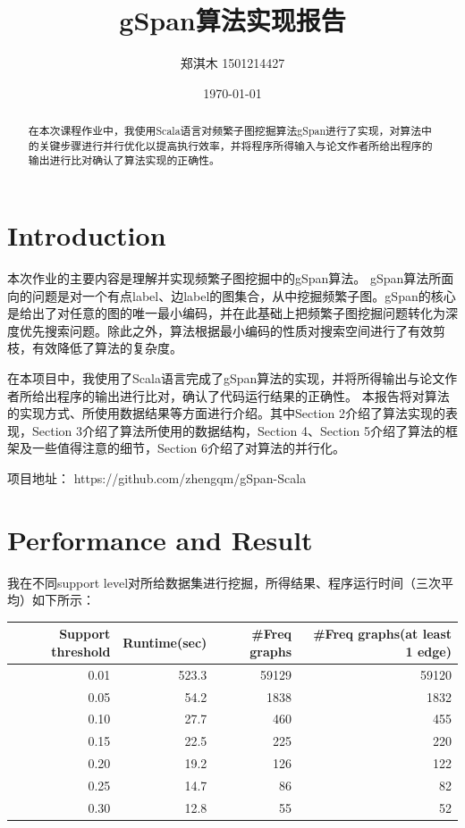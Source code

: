 \documentclass{article}
\title{gSpan算法实现报告}
\author{郑淇木  1501214427}
\date{\today}
\begin{document}
\maketitle

\begin{abstract}
在本次课程作业中，我使用Scala语言对频繁子图挖掘算法gSpan进行了实现，对算法中的关键步骤进行并行优化以提高执行效率，并将程序所得输入与论文作者所给出程序的输出进行比对确认了算法实现的正确性。

\end{abstract}

\section{Introduction}
本次作业的主要内容是理解并实现频繁子图挖掘中的gSpan算法\cite{gspan2002,gspanlong}。
gSpan算法所面向的问题是对一个有点label、边label的图集合，从中挖掘频繁子图。gSpan的核心是给出了对任意的图的唯一最小编码，并在此基础上把频繁子图挖掘问题转化为深度优先搜索问题。除此之外，算法根据最小编码的性质对搜索空间进行了有效剪枝，有效降低了算法的复杂度。

在本项目中，我使用了Scala语言完成了gSpan算法的实现，并将所得输出与论文作者所给出程序的输出进行比对，确认了代码运行结果的正确性。
本报告将对算法的实现方式、所使用数据结果等方面进行介绍。其中Section 2介绍了算法实现的表现，Section 3介绍了算法所使用的数据结构，Section 4、Section 5介绍了算法的框架及一些值得注意的细节，Section 6介绍了对算法的并行化。

项目地址： https://github.com/zhengqm/gSpan-Scala

\section{Performance and Result}

我在不同support level对所给数据集进行挖掘，所得结果、程序运行时间（三次平均）如下所示：

\vspace{0.3cm}
\begin{tabular}{rrrr}
\toprule
 Support threshold&  Runtime(sec) &  \#Freq graphs &  \#Freq graphs(at least 1 edge) \\
\midrule
    0.01 &       523.3 &            59129 &                              59120 \\
    0.05 &        54.2 &             1838 &                               1832 \\
    0.10 &        27.7 &              460 &                                455 \\
    0.15 &        22.5 &              225 &                                220 \\
    0.20 &        19.2 &              126 &                                122 \\
    0.25 &        14.7 &               86 &                                 82 \\
    0.30 &        12.8 &               55 &                                 52 \\
\bottomrule
\end{tabular}
\vspace{0.3cm}
\end{document}
